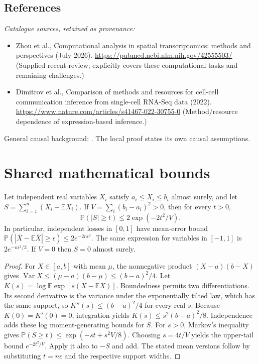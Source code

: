 \documentclass[11pt]{article}
\begin{document}
\subsection{References}
\noindent\emph{Catalogue sources, retained as provenance:}
\begin{itemize}
\item Zhou et al., Computational analysis in spatial transcriptomics: methods and perspectives (July 2026). \url{https://pubmed.ncbi.nlm.nih.gov/42555503/} (Supplied recent review; explicitly covers these computational tasks and remaining challenges.)
\item Dimitrov et al., Comparison of methods and resources for cell-cell communication inference from single-cell RNA-Seq data (2022). \url{https://www.nature.com/articles/s41467-022-30755-0} (Method/resource dependence of expression-based inference.)
\end{itemize}
\noindent General causal background: \cite{pearl}. The local proof states its own causal assumptions.




\section{Shared mathematical bounds}\label{app:bounds}
\begin{lemma}\label{lem:bounded}
Let independent real variables $X_i$ satisfy $a_i\leq X_i\leq b_i$ almost surely,
and let $S=\sum_{i=1}^n(X_i-\mathbb{E} X_i)$. If
$V=\sum_i(b_i-a_i)^2>0$, then for every $t>0$,
\[
 \mathbb{P}(|S|\geq t)\leq 2\exp(-2t^2/V).
\]
In particular, independent losses in $[0,1]$ have mean-error bound
$\mathbb{P}(|\overline X-\mathbb{E}\overline X|\geq\epsilon)
\leq2e^{-2n\epsilon^2}$. The same expression for variables in $[-1,1]$
is $2e^{-n\epsilon^2/2}$. If $V=0$ then $S=0$ almost surely.
\end{lemma}
\begin{proof}
For $X\in[a,b]$ with mean $\mu$, the nonnegative product
$(X-a)(b-X)$ gives
$\operatorname{Var} X\leq(\mu-a)(b-\mu)\leq(b-a)^2/4$.
Let $K(s)=\log\mathbb{E}\exp[s(X-\mathbb{E} X)]$.
Boundedness permits two differentiations. Its second derivative is the variance
under the exponentially tilted law, which has the same support, so
$K''(s)\leq(b-a)^2/4$ for every real $s$.
Because $K(0)=K'(0)=0$, integration yields
$K(s)\leq s^2(b-a)^2/8$.
Independence adds these log moment-generating bounds for $S$.
For $s>0$, Markov's inequality gives
$\mathbb{P}(S\geq t)\leq\exp(-st+s^2V/8)$.
Choosing $s=4t/V$ yields the upper-tail bound $e^{-2t^2/V}$.
Apply it also to $-S$ and add. The stated mean versions follow by substituting
$t=n\epsilon$ and the respective support widths.
\end{proof}
\end{document}
